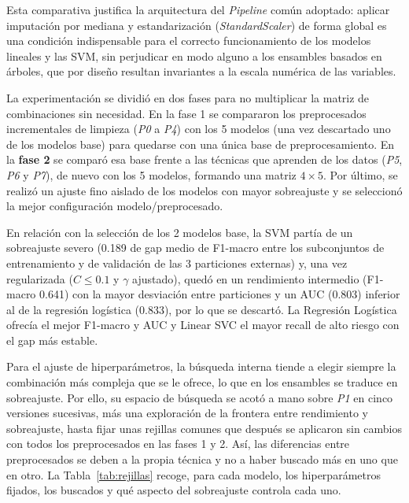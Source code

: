 \documentclass[journal,onecolumn]{IEEEtran}
\begin{document}
Esta comparativa justifica la arquitectura del \textit{Pipeline} común adoptado: aplicar imputación por mediana y estandarización (\textit{StandardScaler}) de forma global es una condición indispensable para el correcto funcionamiento de los modelos lineales y las SVM, sin perjudicar en modo alguno a los ensambles basados en árboles, que por diseño resultan invariantes a la escala numérica de las variables.

La experimentación se dividió en dos fases para no multiplicar la matriz de combinaciones sin necesidad. En la fase 1 se compararon los preprocesados incrementales de limpieza (\textit{P0} a \textit{P4}) con los 5 modelos (una vez descartado uno de los modelos base) para quedarse con una única base de preprocesamiento. En la \textbf{fase 2} se comparó esa base frente a las técnicas que aprenden de los datos (\textit{P5}, \textit{P6} y \textit{P7}), de nuevo con los 5 modelos, formando una matriz $4 \times 5$. Por último, se realizó un ajuste fino aislado de los modelos con mayor sobreajuste y se seleccionó la mejor configuración modelo/preprocesado.

En relación con la selección de los 2 modelos base, la SVM partía de un sobreajuste severo (0.189 de gap medio de F1-macro entre los subconjuntos de entrenamiento y de validación de las 3 particiones externas) y, una vez regularizada ($C \leq 0{.}1$ y $\gamma$ ajustado), quedó en un rendimiento intermedio (F1-macro 0.641) con la mayor desviación entre particiones y un AUC (0.803) inferior al de la regresión logística (0.833), por lo que se descartó. La Regresión Logística ofrecía el mejor F1-macro y AUC y Linear SVC el mayor recall de alto riesgo con el gap más estable.

Para el ajuste de hiperparámetros, la búsqueda interna tiende a elegir siempre la combinación más compleja que se le ofrece, lo que en los ensambles se traduce en sobreajuste. Por ello, su espacio de búsqueda se acotó a mano sobre \textit{P1} en cinco versiones sucesivas, más una exploración de la frontera entre rendimiento y sobreajuste, hasta fijar unas rejillas comunes que después se aplicaron sin cambios con todos los preprocesados en las fases 1 y 2. Así, las diferencias entre preprocesados se deben a la propia técnica y no a haber buscado más en uno que en otro. La Tabla~\ref{tab:rejillas} recoge, para cada modelo, los hiperparámetros fijados, los buscados y qué aspecto del sobreajuste controla cada uno.
\end{document}
